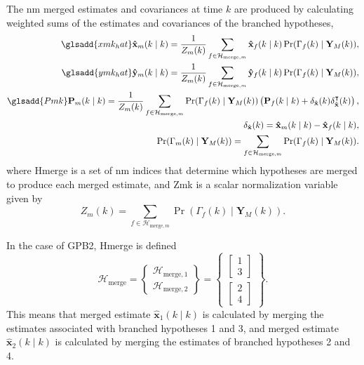 The \gls{nm} merged estimates and covariances at time $k$ are produced by calculating weighted sums of the estimates and covariances of the branched hypotheses,
\begin{equation} \label{eq:xmkymk_hat_MKF}
	\begin{aligned}
		\glsadd{xmk_hat}\mathbf{\hat{x}}_m(k \mid k) = \frac{1}{Z_m(k)} \sum_{f \in \mathcal{H}_{\text{merge},m}} \mathbf{\hat{x}}_f(k \mid k) \Pr(\Gamma_f(k) \mid \mathbf{Y}_M(k)), \\
		\glsadd{ymk_hat}\mathbf{\hat{y}}_m(k \mid k) = \frac{1}{Z_m(k)} \sum_{f \in \mathcal{H}_{\text{merge},m}} \mathbf{\hat{y}}_f(k \mid k) \Pr(\Gamma_f(k) \mid \mathbf{Y}_M(k)),\\
		\glsadd{Pmk}\mathbf{P}_m(k \mid k) = \frac{1}{Z_m(k)} \sum_{f \in \mathcal{H}_{\text{merge},m}} \Pr(\Gamma_f(k) \mid \mathbf{Y}_M(k)) \left( \mathbf{P}_f(k \mid k) + \delta_\mathbf{\hat{x}}(k) \delta_\mathbf{\hat{x}}^\intercal(k) \right), \\
		\delta_\mathbf{\hat{x}}(k) = \mathbf{\hat{x}}_m(k \mid k) - \mathbf{\hat{x}}_f(k \mid k), \\
		\Pr(\Gamma_m(k) \mid \mathbf{Y}_M(k)) = \sum_{f \in \mathcal{H}_{\text{merge},m}} \Pr(\Gamma_f(k) \mid \mathbf{Y}_M(k)).
	\end{aligned}
\end{equation}
where \gls{Hmerge} is a set of \gls{nm} indices that determine which hypotheses are merged to produce each merged estimate, and \gls{Zmk} is a scalar normalization variable given by
\begin{equation} \label{eq:Zmk}
	Z_m(k) = \sum_{f \in \mathcal{H}_{\text{merge},m}} \Pr(\Gamma_f(k) \mid \mathbf{Y}_M(k)).
\end{equation}

In the case of \gls{GPB2}, \gls{Hmerge} is defined
\begin{equation} \label{eq:Hmerge_GPB2}
	\mathcal{H}_{\text{merge}} = \begin{Bmatrix} \mathcal{H}_{\text{merge},1} \\ \mathcal{H}_{\text{merge},2} \end{Bmatrix} = \begin{Bmatrix}
		\begin{bmatrix}	1 \\ 3 \end{bmatrix} \\
		\begin{bmatrix}	2 \\ 4 \end{bmatrix}
	\end{Bmatrix}.
\end{equation}
This means that merged estimate $\mathbf{\hat{x}}_1(k \mid k)$ is calculated by merging the estimates associated with branched hypotheses 1 and 3, and merged estimate $\mathbf{\hat{x}}_2(k \mid k)$ is calculated by merging the estimates of branched hypotheses 2 and 4.

